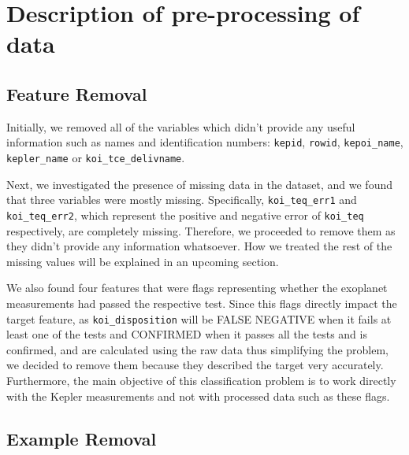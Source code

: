 
\section{Description of pre-processing of data}%
\label{sec:desc-prep}


\subsection{Feature Removal}

Initially, we removed all of the variables which didn't provide any useful information
such as names and identification numbers: \texttt{kepid}, \texttt{rowid}, 
\texttt{kepoi\_name}, \texttt{kepler\_name} or \texttt{koi\_tce\_delivname}.

Next, we investigated the presence of missing data in the dataset, and we found that three
variables were mostly missing. Specifically, \texttt{koi\_teq\_err1} and 
\texttt{koi\_teq\_err2}, which represent the positive and negative error 
of \texttt{koi\_teq} respectively, are completely missing. Therefore, we proceeded to 
remove them as they didn't provide any information whatsoever. How we treated the rest
of the missing values will be explained in an upcoming section.

We also found four features that were flags representing whether the exoplanet
measurements had passed the respective test. Since this flags directly impact the
target feature, as \texttt{koi\_disposition} will be FALSE NEGATIVE when it fails
at least one of the tests and CONFIRMED when it passes all the tests and is confirmed,
and are calculated using the raw data thus simplifying the problem, we decided to 
remove them because they described the target very accurately. Furthermore, the
main objective of this classification problem is to work directly with the Kepler
measurements and not with processed data such as these flags.

\subsection{Example Removal}

